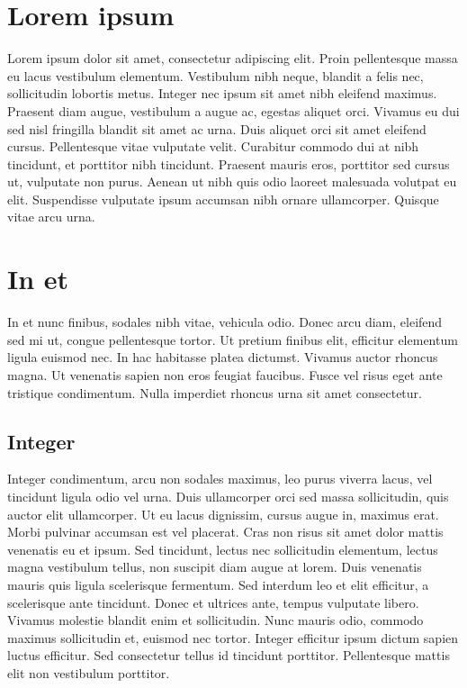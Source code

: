 \graphicspath{ {images_thesis/} }
\section{Lorem ipsum}
Lorem\cite{lorem_article} ipsum dolor sit amet, consectetur adipiscing elit. Proin pellentesque massa eu lacus vestibulum elementum. Vestibulum nibh neque, blandit a felis nec, sollicitudin lobortis metus. Integer nec ipsum sit amet nibh eleifend maximus. Praesent diam augue, vestibulum a augue ac, egestas aliquet orci. Vivamus eu dui sed nisl fringilla blandit sit amet ac urna. Duis aliquet orci sit amet eleifend cursus. Pellentesque vitae vulputate velit. Curabitur commodo dui at nibh tincidunt, et porttitor nibh tincidunt. Praesent mauris eros, porttitor sed cursus ut, vulputate non purus. Aenean ut nibh quis odio laoreet malesuada volutpat eu elit. Suspendisse vulputate ipsum accumsan nibh ornare ullamcorper. Quisque vitae arcu urna.
\section{In et}
In et nunc finibus, sodales nibh vitae, vehicula odio. Donec arcu diam, eleifend sed mi ut, congue pellentesque tortor. Ut pretium finibus elit, efficitur elementum ligula euismod nec. In hac habitasse platea dictumst. Vivamus auctor rhoncus magna. Ut venenatis sapien non eros feugiat faucibus. Fusce vel risus eget ante tristique condimentum. Nulla imperdiet rhoncus urna sit amet consectetur.
\subsection{Integer}
Integer condimentum, arcu non sodales maximus, leo purus viverra lacus, vel tincidunt ligula odio vel urna. Duis ullamcorper orci sed massa sollicitudin, quis auctor elit ullamcorper. Ut eu lacus dignissim, cursus augue in, maximus erat. Morbi pulvinar accumsan est vel placerat. Cras non risus sit amet dolor mattis venenatis eu et ipsum. Sed tincidunt, lectus nec sollicitudin elementum, lectus magna vestibulum tellus, non suscipit diam augue at lorem. Duis venenatis mauris quis ligula scelerisque fermentum. Sed interdum leo et elit efficitur, a scelerisque ante tincidunt. Donec et ultrices ante, tempus vulputate libero. Vivamus molestie blandit enim et sollicitudin. Nunc mauris odio, commodo maximus sollicitudin et, euismod nec tortor. Integer efficitur ipsum dictum sapien luctus efficitur. Sed consectetur tellus id tincidunt porttitor. Pellentesque mattis elit non vestibulum porttitor.
